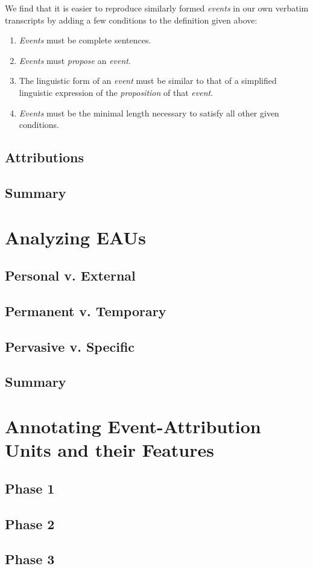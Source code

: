 \documentclass[a4paper,12pt]{article}
\begin{document}
We find that it is easier to reproduce similarly formed \emph{events} in our own verbatim transcripts by adding a few conditions to the definition given above:
\begin{enumerate}
    \item \emph{Events} must be complete sentences.
    \item \emph{Events} must \emph{propose} an \emph{event}.
    \item The linguistic form of an \emph{event} must be similar to that of a simplified linguistic expression of the \emph{proposition} of that \emph{event}. %
    \item \emph{Events} must be the minimal length necessary to satisfy all other given conditions.
\end{enumerate}

\subsection{Attributions}
\subsection{Summary}

\section{Analyzing EAUs}
\subsection{Personal v. External}
\subsection{Permanent v. Temporary}
\subsection{Pervasive v. Specific}
\subsection{Summary}

\section{Annotating Event-Attribution Units and their Features}
\subsection{Phase 1}
\subsection{Phase 2}
\subsection{Phase 3}
\end{document}
